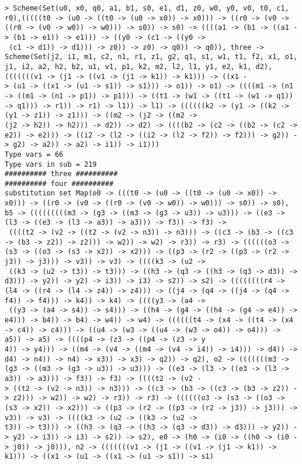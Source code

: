 \documentclass[11pt,oneside,a4paper]{report}
\begin{document}
\begin{lstlisting}[breaklines=true,caption={The output of an exponential type},label=lst:appedix:bigexp]
> Scheme(Set(u0, x0, q0, a1, b1, s0, e1, d1, z0, w0, y0, v0, t0, c1, r0),(((((t0 -> (u0 -> ((t0 -> (u0 -> x0)) -> x0))) -> ((r0 -> (v0 -> ((r0 -> (v0 -> w0)) -> w0))) -> s0)) -> s0) -> ((((a1 -> (b1 -> ((a1 -> (b1 -> e1)) -> e1))) -> ((y0 -> (c1 -> ((y0 ->
 (c1 -> d1)) -> d1))) -> z0)) -> z0) -> q0)) -> q0)), three -> Scheme(Set(j2, i1, m1, c2, n1, r1, z1, g2, q1, s1, w1, t1, f2, x1, o1, j1, i2, a2, h2, b2, u1, v1, p1, k2, m2, l2, l1, y1, e2, k1, d2),(((((((v1 -> (j1 -> ((v1 -> (j1 -> k1)) -> k1))) -> ((x1 -
> (u1 -> ((x1 -> (u1 -> s1)) -> s1))) -> o1)) -> o1) -> ((((m1 -> (n1 -> ((m1 -> (n1 -> p1)) -> p1))) -> ((t1 -> (w1 -> ((t1 -> (w1 -> q1)) -> q1))) -> r1)) -> r1) -> l1)) -> l1) -> ((((((k2 -> (y1 -> ((k2 -> (y1 -> z1)) -> z1))) -> ((m2 -> (j2 -> ((m2 ->
(j2 -> h2)) -> h2))) -> d2)) -> d2) -> ((((b2 -> (c2 -> ((b2 -> (c2 -> e2)) -> e2))) -> ((i2 -> (l2 -> ((i2 -> (l2 -> f2)) -> f2))) -> g2)) -> g2) -> a2)) -> a2) -> i1)) -> i1)))
Type vars = 66
Type vars in sub = 219
########## three ##########
########## four ##########
substitution set Map(o0 -> (((t0 -> (u0 -> ((t0 -> (u0 -> x0)) -> x0))) -> ((r0 -> (v0 -> ((r0 -> (v0 -> w0)) -> w0))) -> s0)) -> s0), b5 -> (((((((((m3 -> (g3 -> ((m3 -> (g3 -> u3)) -> u3))) -> ((e3 -> (l3 -> ((e3 -> (l3 -> a3)) -> a3))) -> f3)) -> f3) ->
 ((((t2 -> (v2 -> ((t2 -> (v2 -> n3)) -> n3))) -> ((c3 -> (b3 -> ((c3 -> (b3 -> z2)) -> z2))) -> w2)) -> w2) -> r3)) -> r3) -> ((((((o3 -> (s3 -> ((o3 -> (s3 -> x2)) -> x2))) -> ((p3 -> (r2 -> ((p3 -> (r2 -> j3)) -> j3))) -> v3)) -> v3) -> ((((k3 -> (u2 ->
 ((k3 -> (u2 -> t3)) -> t3))) -> ((h3 -> (q3 -> ((h3 -> (q3 -> d3)) -> d3))) -> y2)) -> y2) -> i3)) -> i3) -> s2)) -> s2) -> ((((((((r4 -> (l4 -> ((r4 -> (l4 -> z4)) -> z4))) -> ((j4 -> (q4 -> ((j4 -> (q4 -> f4)) -> f4))) -> k4)) -> k4) -> ((((y3 -> (a4 ->
 ((y3 -> (a4 -> s4)) -> s4))) -> ((h4 -> (g4 -> ((h4 -> (g4 -> e4)) -> e4))) -> b4)) -> b4) -> w4)) -> w4) -> ((((((t4 -> (x4 -> ((t4 -> (x4 -> c4)) -> c4))) -> ((u4 -> (w3 -> ((u4 -> (w3 -> o4)) -> o4))) -> a5)) -> a5) -> ((((p4 -> (z3 -> ((p4 -> (z3 -> y
4)) -> y4))) -> ((m4 -> (v4 -> ((m4 -> (v4 -> i4)) -> i4))) -> d4)) -> d4) -> n4)) -> n4) -> x3)) -> x3) -> q2)) -> q2), o2 -> (((((((m3 -> (g3 -> ((m3 -> (g3 -> u3)) -> u3))) -> ((e3 -> (l3 -> ((e3 -> (l3 -> a3)) -> a3))) -> f3)) -> f3) -> ((((t2 -> (v2 -
> ((t2 -> (v2 -> n3)) -> n3))) -> ((c3 -> (b3 -> ((c3 -> (b3 -> z2)) -> z2))) -> w2)) -> w2) -> r3)) -> r3) -> ((((((o3 -> (s3 -> ((o3 -> (s3 -> x2)) -> x2))) -> ((p3 -> (r2 -> ((p3 -> (r2 -> j3)) -> j3))) -> v3)) -> v3) -> ((((k3 -> (u2 -> ((k3 -> (u2 ->
t3)) -> t3))) -> ((h3 -> (q3 -> ((h3 -> (q3 -> d3)) -> d3))) -> y2)) -> y2) -> i3)) -> i3) -> s2)) -> s2), e0 -> (h0 -> (i0 -> ((h0 -> (i0 -> j0)) -> j0))), n2 -> (((((((v1 -> (j1 -> ((v1 -> (j1 -> k1)) -> k1))) -> ((x1 -> (u1 -> ((x1 -> (u1 -> s1)) -> s1)

\end{lstlisting}
\end{document}
